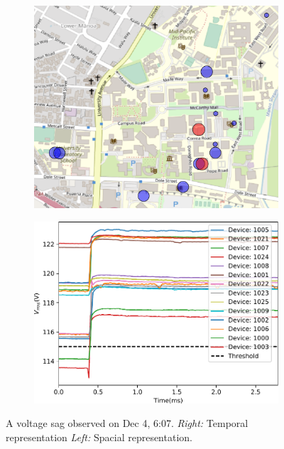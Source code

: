 \begin{figure}[ht!]
    \centering
    \begin{subfigure}{0.49\textwidth}
        \centering
        \includegraphics[width=1\linewidth]{img/napali_eval/subthreshold/clustering/366584.pdf}
    \end{subfigure}%
    \begin{subfigure}{0.49\textwidth}
        \centering
        \includegraphics[width=1\linewidth]{img/napali_eval/subthreshold/clustering/366584_data.pdf}
    \end{subfigure}
    \caption{
    A voltage sag observed on Dec 4, 6:07.
    \textit{Right:} Temporal representation
    \textit{Left:} Spacial representation.
    }
    \label{fig:expdes:sub:ev4}
\end{figure}

